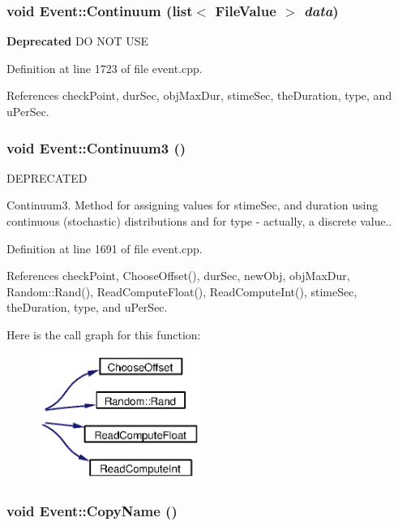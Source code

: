 \subsubsection{\setlength{\rightskip}{0pt plus 5cm}void Event::Continuum (list$<$ {\bf File\-Value} $>$ {\em data})}\label{classEvent_a48}


\begin{Desc}
\item[{\bf Deprecated}]DO NOT USE \end{Desc}


Definition at line 1723 of file event.cpp.

References check\-Point, dur\-Sec, obj\-Max\-Dur, stime\-Sec, the\-Duration, type, and u\-Per\-Sec.
\subsubsection{\setlength{\rightskip}{0pt plus 5cm}void Event::Continuum3 ()}\label{classEvent_a30}


DEPRECATED

Continuum3. Method for assigning values for stime\-Sec, and duration using continuous (stochastic) distributions and for type - actually, a discrete value.. 

Definition at line 1691 of file event.cpp.

References check\-Point, Choose\-Offset(), dur\-Sec, new\-Obj, obj\-Max\-Dur, Random::Rand(), Read\-Compute\-Float(), Read\-Compute\-Int(), stime\-Sec, the\-Duration, type, and u\-Per\-Sec.

Here is the call graph for this function:\begin{figure}[H]
\begin{center}
\leavevmode
\includegraphics[width=149pt]{classEvent_a30_cgraph}
\end{center}
\end{figure}
\subsubsection{\setlength{\rightskip}{0pt plus 5cm}void Event::Copy\-Name ()}\label{classEvent_a28}


